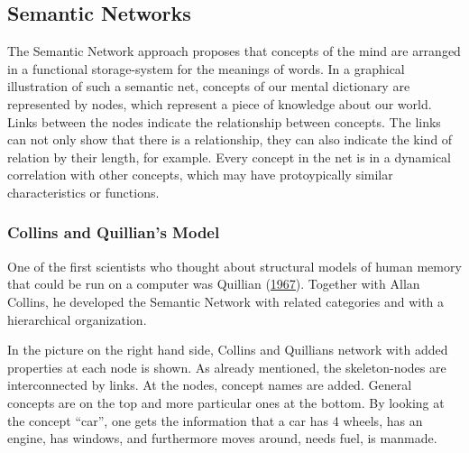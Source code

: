 \documentclass[
]{krantz}
\begin{document}
\hypertarget{semantic-networks}{%
\subsection*{Semantic Networks}\label{semantic-networks}}


The Semantic Network approach proposes that concepts of the mind are arranged in a functional storage-system for the meanings of words. In a graphical illustration of such a semantic net, concepts of our mental dictionary are represented by nodes, which represent a piece of knowledge about our world. Links between the nodes indicate the relationship between concepts. The links can not only show that there is a relationship, they can also indicate the kind of relation by their length, for example. Every concept in the net is in a dynamical correlation with other concepts, which may have protoypically similar characteristics or functions.

\hypertarget{collins-and-quillians-model}{%
\subsubsection*{Collins and Quillian's Model}\label{collins-and-quillians-model}}


One of the first scientists who thought about structural models of human memory that could be run on a computer was Quillian (\protect\hyperlink{ref-quillian1967word}{1967}). Together with Allan Collins, he developed the Semantic Network with related categories and with a hierarchical organization.

In the picture on the right hand side, Collins and Quillians network with added properties at each node is shown. As already mentioned, the skeleton-nodes are interconnected by links. At the nodes, concept names are added. General concepts are on the top and more particular ones at the bottom. By looking at the concept ``car'', one gets the information that a car has 4 wheels, has an engine, has windows, and furthermore moves around, needs fuel, is manmade.
\end{document}
